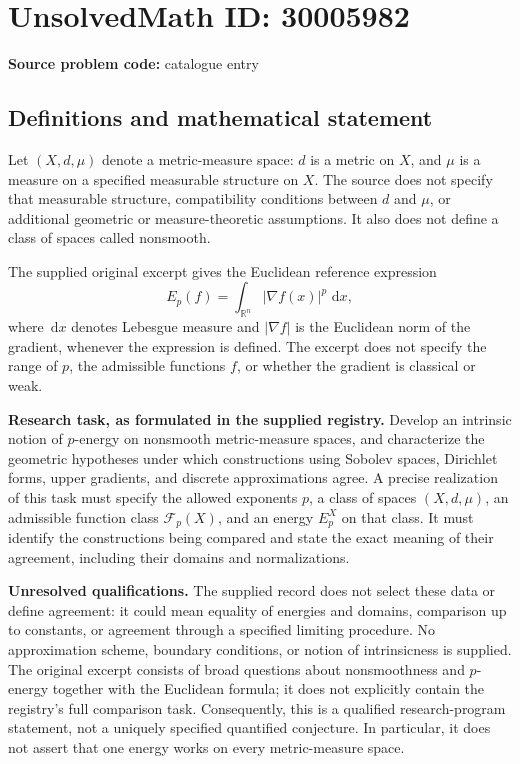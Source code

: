 \documentclass[11pt]{article}
\newcommand{\R}{\mathbb{R}}
\newcommand{\dd}{\,\mathrm{d}}
\begin{document}
\section*{UnsolvedMath ID: 30005982}
\textbf{Source problem code:} catalogue entry
\subsection{Definitions and mathematical statement}
Let \((X,d,\mu)\) denote a metric-measure space: \(d\) is a metric on \(X\), and \(\mu\) is a measure on a specified measurable structure on \(X\). The source does not specify that measurable structure, compatibility conditions between \(d\) and \(\mu\), or additional geometric or measure-theoretic assumptions. It also does not define a class of spaces called nonsmooth.

The supplied original excerpt gives the Euclidean reference expression
\[
E_p(f)=\int_{\R^n}|\nabla f(x)|^p\,\dd x,
\]
where \(\dd x\) denotes Lebesgue measure and \(|\nabla f|\) is the Euclidean norm of the gradient, whenever the expression is defined. The excerpt does not specify the range of \(p\), the admissible functions \(f\), or whether the gradient is classical or weak.

\textbf{Research task, as formulated in the supplied registry.} Develop an intrinsic notion of \(p\)-energy on nonsmooth metric-measure spaces, and characterize the geometric hypotheses under which constructions using Sobolev spaces, Dirichlet forms, upper gradients, and discrete approximations agree. A precise realization of this task must specify the allowed exponents \(p\), a class of spaces \((X,d,\mu)\), an admissible function class \(\mathcal F_p(X)\), and an energy \(E_p^X\) on that class. It must identify the constructions being compared and state the exact meaning of their agreement, including their domains and normalizations.

\textbf{Unresolved qualifications.} The supplied record does not select these data or define agreement: it could mean equality of energies and domains, comparison up to constants, or agreement through a specified limiting procedure. No approximation scheme, boundary conditions, or notion of intrinsicness is supplied. The original excerpt consists of broad questions about nonsmoothness and \(p\)-energy together with the Euclidean formula; it does not explicitly contain the registry's full comparison task. Consequently, this is a qualified research-program statement, not a uniquely specified quantified conjecture. In particular, it does not assert that one energy works on every metric-measure space.
\end{document}
